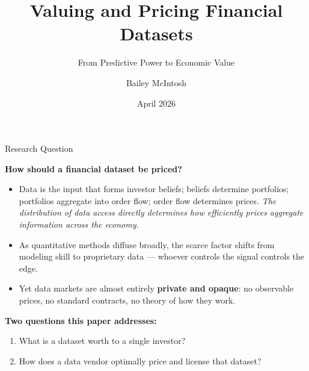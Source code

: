 \documentclass[12pt, aspectratio=169]{beamer}
\title{Valuing and Pricing Financial Datasets}
\subtitle{From Predictive Power to Economic Value}
\author{Bailey McIntosh}
\institute{Wharton Research Scholars}
\date{April 2026}
\begin{document}
\begin{frame}
  \titlepage
\end{frame}

\begin{frame}{Research Question}

\textbf{How should a financial dataset be priced?}

\medskip
\begin{itemize}\setlength\itemsep{6pt}
  \item Data is the input that forms investor beliefs; beliefs determine
        portfolios; portfolios aggregate into order flow; order flow determines
        prices. \emph{The distribution of data access directly determines how
        efficiently prices aggregate information across the economy.}
  \item As quantitative methods diffuse broadly, the scarce factor shifts from
        modeling skill to proprietary data --- whoever controls the signal
        controls the edge.
  \item Yet data markets are almost entirely \textbf{private and opaque}:
        no observable prices, no standard contracts, no theory of how they work.
\end{itemize}

\medskip
\textbf{Two questions this paper addresses:}
\begin{enumerate}
  \item What is a dataset worth to a single investor?
  \item How does a data vendor optimally price and license that dataset?
\end{enumerate}

\end{frame}
\end{document}

